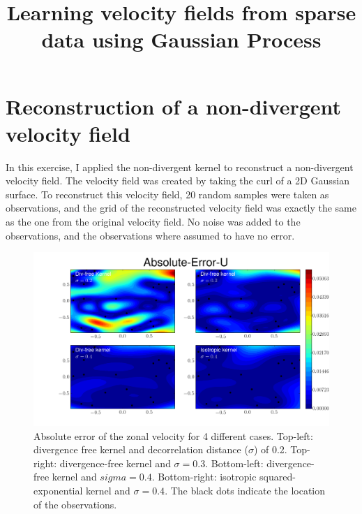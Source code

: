 \documentclass[12pt,a4paper]{article}%
\title{Learning velocity fields from sparse data using Gaussian Process}
\author{}
\begin{document}
\section{Reconstruction of a non-divergent velocity field}
In this exercise, I applied the non-divergent kernel to reconstruct 
a non-divergent velocity field. The velocity field was created by taking 
the curl of a 2D Gaussian surface. To reconstruct this velocity field, 
20 random samples were taken as observations, and the grid of the reconstructed 
velocity field was exactly the same as the one from the original velocity field. 
No noise was added to the observations, and the observations where assumed to 
have no error.

\newpage

\begin{figure}
\noindent\includegraphics[width=32pc]{plots/Absolute-Error-U-contour.png}
\caption{Absolute error of the zonal velocity for 4 different cases. Top-left: 
divergence free kernel and decorrelation distance ($\sigma$) of 0.2. 
Top-right: divergence-free kernel and $\sigma=0.3$. Bottom-left: 
divergence-free kernel and $sigma=0.4$. Bottom-right: isotropic 
squared-exponential kernel and $\sigma=0.4$. The black dots indicate the location 
of the observations.}
\label{contour_u}
\end{figure}
\end{document}

